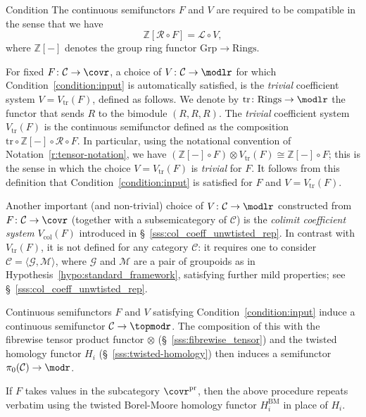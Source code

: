 \documentclass[AHL,Unicode,published]{cedram}
\newcommand{\pr}{\ensuremath{\mathrm{pr}}}
\newcommand{\BM}{\mathrm{BM}}
\newcommand{\Rings}{\ensuremath{\mathrm{Rings}}}
\newcommand{\groups}{\ensuremath{\mathrm{Grp}}}
\newcommand{\triv}{\mathrm{tr}}
\newcommand{\col}{\mathrm{col}}
\newcommand{\sR}{\mathscr{R}}
\newcommand{\sL}{\mathscr{L}}
\newcommand{\cC}{\mathcal{C}}
\newcommand{\cG}{\mathcal{G}}
\newcommand{\cM}{\mathcal{M}}
\newcommand{\bZ}{\mathbb{Z}}
\begin{document}
\begin{enonce}{Condition}\label{condition:input}
The continuous semifunctors $F$ and $V$ are required to be compatible in the sense that we have
\[
\bZ[\sR\circ F] = \sL \circ V,
\]
where $\bZ[-]$ denotes the group ring functor $\groups \to \Rings$.
\end{enonce}

\begin{exam}\label{eg:trivial_fibrewise_tensor_product}
For fixed $F \colon \cC \to \covr$, a choice of $V \colon \cC \to \modlr$ for which Condition~\ref{condition:input} is automatically satisfied, is the \emph{trivial} coefficient system $V = V_{\triv}(F)$, defined as follows. We denote by $\triv \colon \Rings \to \modlr$ the functor that sends $R$ to the bimodule $(R,R,R)$. The \emph{trivial} coefficient system $V_{\triv}(F)$ is the continuous semifunctor defined as the composition $\triv \circ \bZ[-] \circ \sR \circ F$. In particular, using the notational convention of Notation~\ref{r:tensor-notation}, we have $(\bZ[-] \circ F) \otimes V_{\triv}(F) \cong \bZ[-] \circ F$; this is the sense in which the choice $V = V_{\triv}(F)$ is \emph{trivial} for $F$. It follows from this definition that Condition~\ref{condition:input} is satisfied for $F$ and $V = V_{\triv}(F)$.

Another important (and non-trivial) choice of $V \colon \cC \to \modlr$ constructed from $F \colon \cC \to \covr$ (together with a subsemicategory of $\cC$) is the \emph{colimit coefficient system} $V_{\col}(F)$ introduced in \S~\ref{sss:col_coeff_unwtisted_rep}. In contrast with $V_{\triv}(F)$, it is not defined for any category $\cC$: it requires one to consider $\cC = \langle \cG, \cM \rangle$, where $\cG$ and $\cM$ are a pair of groupoids as in Hypothesis~\ref{hypo:standard_framework}, satisfying further mild properties; see \S~\ref{sss:col_coeff_unwtisted_rep}.
\end{exam}

\begin{theo}\label{thm:construction}
Continuous semifunctors $F$ and $V$ satisfying Condition~\ref{condition:input} induce a continuous semifunctor $\cC \to \topmodr$. The composition of this with the fibrewise tensor product functor $\otimes$ \textup{(\S~\ref{sss:fibrewise_tensor})} and the twisted homology functor $H_{i}$ (\S~\ref{sss:twisted-homology}) then induces a semifunctor $\pi_{0}(\cC) \to \modr$.

If $F$ takes values in the subcategory $\covr^{\pr}$, then the above procedure repeats verbatim using the twisted Borel-Moore homology functor $H^{\BM}_{i}$ in place of $H_i$.
\end{theo}
\end{document}
